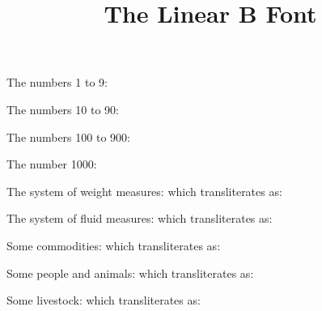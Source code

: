 \documentclass{article}
\title{The Linear B Font}
\author{}
\date{}
\begin{document}
    The numbers 1 to 9: \textlinb{\BNi{} \BNii{} \BNiii{} \BNiv{} \BNv{} \BNvi{} \BNvii{} \BNviii{} \BNix}

    The numbers 10 to 90: \textlinb{\BNx{} \BNxx{} \BNxxx{} \BNxl{} \BNl{} \BNlx{} \BNlxx{} \BNlxxx{} \BNxc}

    The numbers 100 to 900: \textlinb{\BNc{} \BNcc{} \BNccc{} \BNcd{} \BNd{} \BNdc{} \BNdcc{} \BNdccc{} \BNcm}

    The number 1000: \textlinb{\BNm}
    
    \newcommand{\weights}{\BPwta\ \BPwtb\ \BPwtc\ \BPwtd\ \BPtalent}
The system of weight measures: \textlinb{\weights} which transliterates as:
                       \translitlinb{\weights}

\newcommand{\fluids}{\BPvola\ \BPvolb\ \BPvolcd\ \BPvolcf}
The system of fluid measures: \textlinb{\fluids} which transliterates as:
                       \translitlinb{\fluids}

\newcommand{\commodities}{\BPcloth\ \BPwool\ \BPwheat\ \BPbarley\
                         \BPwine\ \BPolive\ \BPbronze\ \BPgold}
Some commodities: \textlinb{\commodities} which transliterates as:
                       \translitlinb{\commodities}

\newcommand{\menhorses}{\BPman\ \BPwoman\ \BPhorse\ \BPfoal}
Some people and animals: \textlinb{\menhorses}  which transliterates as:
                         \translitlinb{\menhorses}

\newcommand{\livestock}{\BPpig\ \BPboar\ \BPsow\
                        \BPox\ \BPbull\ \BPcow\
                        \BPsheep\ \BPram\ \BPewe\
                        \BPgoat\ \BPbilly\ \BPnanny}
Some livestock: \textlinb{\livestock}  which transliterates as:
                         \translitlinb{\livestock}
    
\end{document}
